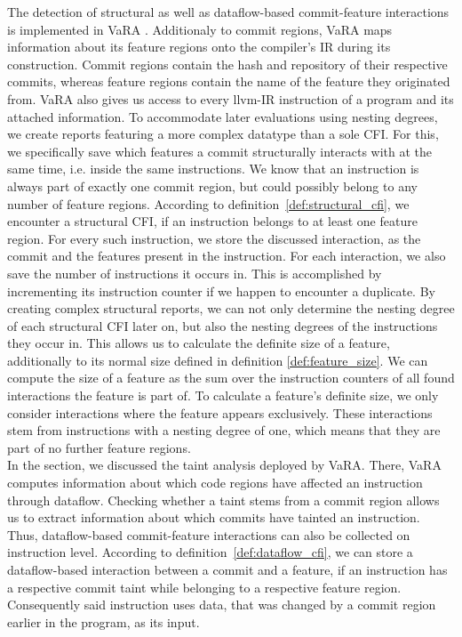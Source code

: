 The detection of structural as well as dataflow-based commit-feature interactions is implemented in VaRA \cite{VaRA2023}.
Additionaly to commit regions, VaRA maps information about its feature regions onto the compiler's IR during its construction.
Commit regions contain the hash and repository of their respective commits, whereas feature regions contain the name of the feature they originated from.
VaRA also gives us access to every llvm-IR instruction of a program and its attached information.
To accommodate later evaluations using nesting degrees, we create reports featuring a more complex datatype than a sole CFI.
For this, we specifically save which features a commit structurally interacts with at the same time, i.e. inside the same instructions.
We know that an instruction is always part of exactly one commit region, but could possibly belong to any number of feature regions.
According to definition~\ref{def:structural_cfi}, we encounter a structural CFI, if an instruction belongs to at least one feature region.
For every such instruction, we store the discussed interaction, as the commit and the features present in the instruction.
For each interaction, we also save the number of instructions it occurs in. 
This is accomplished by incrementing its instruction counter if we happen to encounter a duplicate. 
By creating complex structural reports, we can not only determine the nesting degree of each structural CFI later on, but also the nesting degrees of the instructions they occur in.
This allows us to calculate the definite size of a feature, additionally to its normal size defined in definition \ref{def:feature_size}.
We can compute the size of a feature as the sum over the instruction counters of all found interactions the feature is part of.
To calculate a feature's definite size, we only consider interactions where the feature appears exclusively.
These interactions stem from instructions with a nesting degree of one, which means that they are part of no further feature regions. \\
In the  section, we discussed the taint analysis deployed by VaRA.
There, VaRA computes information about which code regions have affected an instruction through dataflow.
Checking whether a taint stems from a commit region allows us to extract information about which commits have tainted an instruction.
Thus, dataflow-based commit-feature interactions can also be collected on instruction level.
According to definition~\ref{def:dataflow_cfi}, we can store a dataflow-based interaction between a commit and a feature, if an instruction has a respective commit taint while belonging to a respective feature region.
Consequently said instruction uses data, that was changed by a commit region earlier in the program, as its input. 

